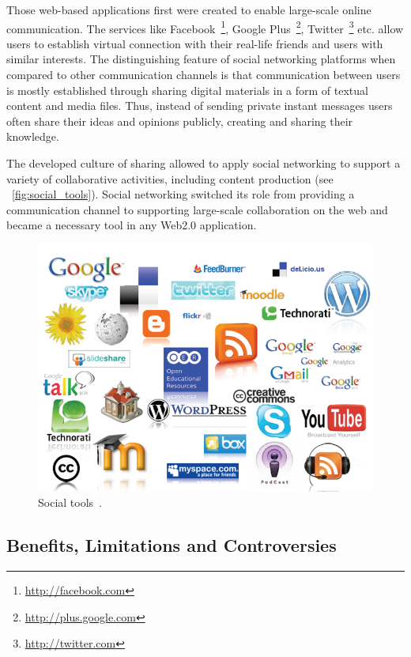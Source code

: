 \documentclass[ngerman,UKenglish,table]{scrbook}
\begin{document}
Those web-based applications first were created to enable large-scale online communication.
The services like Facebook~\footnote{\url{http://facebook.com}}, Google Plus~\footnote{\url{http://plus.google.com}}, Twitter~\footnote{\url{http://twitter.com}} etc. allow users to establish virtual connection with their real-life friends and users with similar interests.
The distinguishing feature of social networking platforms when compared to other communication channels is that communication between users is mostly established through sharing digital materials in a form of textual content and media files.  
Thus, instead of sending private instant messages users often share their ideas and opinions publicly, creating and sharing their knowledge.

The developed culture of sharing allowed to apply social networking to support a variety of collaborative activities, including content production (see ~\autoref{fig:social_tools}).
Social networking switched its role from providing a communication channel to supporting large-scale collaboration on the web and became a necessary tool in any Web2.0 application. 

\begin{figure}[!ht]
\centering
\includegraphics[scale=1]{images/social_media.png}
\caption{Social tools~\cite{rodriguez}.}
\label{fig:social_tools}
\end{figure}



\subsection{Benefits, Limitations and Controversies}
\end{document}

